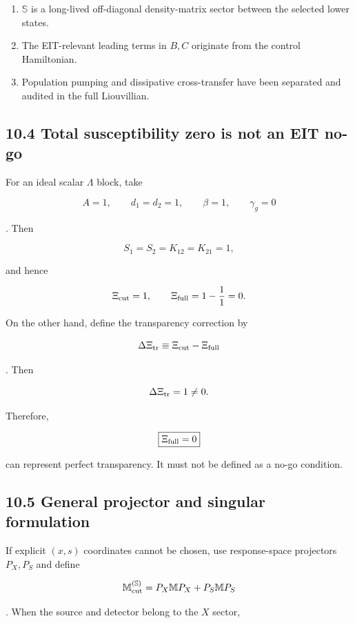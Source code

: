 \documentclass[
  10pt,
  a4paper,
]{article}
\providecommand{\tightlist}{%
  \setlength{\itemsep}{0pt}\setlength{\parskip}{0pt}}
\begin{document}
\begin{enumerate}
\def\labelenumi{\arabic{enumi}.}
\tightlist
\item
  \(\mathbb S\) is a long-lived off-diagonal density-matrix sector
  between the selected lower states.
\item
  The EIT-relevant leading terms in \(B,C\) originate from the control
  Hamiltonian.
\item
  Population pumping and dissipative cross-transfer have been separated
  and audited in the full Liouvillian.
\end{enumerate}

\subsection{10.4 Total susceptibility zero is not an EIT
no-go}\label{total-susceptibility-zero-is-not-an-eit-no-go}

For an ideal scalar \(\Lambda\) block, take

\[
A=1,
\qquad
d_1=d_2=1,
\qquad
\beta=1,
\qquad
\gamma_g=0
\]

. Then

\[
S_1=S_2=K_{12}=K_{21}=1,
\]

and hence

\[
\Xi_{\rm cut}=1,
\qquad
\Xi_{\rm full}
=1-\frac{1}{1}=0.
\]

On the other hand, define the transparency correction by

\[
\Delta\Xi_{\rm tr}
\equiv
\Xi_{\rm cut}-\Xi_{\rm full}
\]

. Then

\[
\Delta\Xi_{\rm tr}=1\neq0.
\]

Therefore,

\[
\boxed{
\Xi_{\rm full}=0
}
\]

can represent perfect transparency. It must not be defined as a no-go
condition.

\subsection{10.5 General projector and singular
formulation}\label{general-projector-and-singular-formulation}

If explicit \((x,s)\) coordinates cannot be chosen, use response-space
projectors \(P_X,P_S\) and define

\[
\mathbb M_{\rm cut}^{(\mathbb S)}
=P_X\mathbb MP_X+P_S\mathbb MP_S
\]

. When the source and detector belong to the \(X\) sector,
\end{document}
